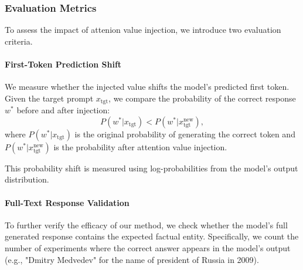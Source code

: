\subsubsection{Evaluation Metrics}
To assess the impact of attenion value injection, we introduce two evaluation criteria.

\paragraph{First-Token Prediction Shift}
We measure whether the injected value shifts the model’s predicted first token. 
Given the target prompt \( x_{\text{tgt}} \), we compare the probability of the correct response \( w^* \) before and after injection:
\begin{equation}
    P(w^* | x_{\text{tgt}}) < P(w^* | x_{\text{tgt}}^{\text{new}}),
\end{equation}
where \( P(w^* | x_{\text{tgt}}) \) is the original probability of generating the correct token and \( P(w^* | x_{\text{tgt}}^{\text{new}}) \) is the probability after attention value injection.

This probability shift is measured using log-probabilities from the model's output distribution.

\paragraph{Full-Text Response Validation}
To further verify the efficacy of our method, we check whether the model’s full generated response contains the expected factual entity. Specifically, we count the number of experiments where the correct answer appears in the model's output (e.g., "Dmitry Medvedev" for the name of president of Russia in 2009).


